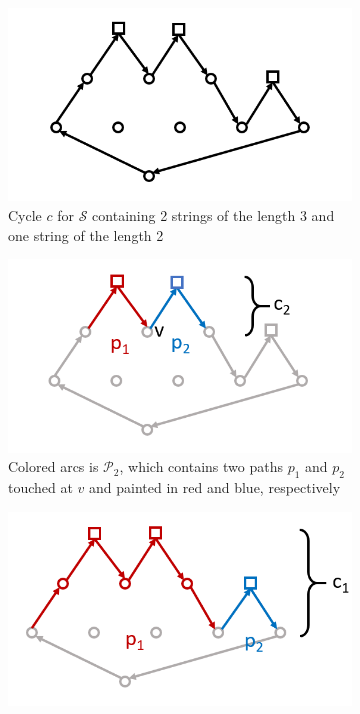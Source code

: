 \documentclass[11pt]{article}
\begin{document}
	\begin{figure}[h]
		\centering
		\begin{subfigure}[t]{0.3\textwidth}
			\includegraphics[width=\textwidth]{gha_is_greedy_img/fig1.png}
			\caption{Cycle $c$ for $\mathcal{S}$ containing 2 strings of the length 3 and one string of the length 2}
			\label{fig:1a}
		\end{subfigure}
		\hfil
		\begin{subfigure}[t]{0.3\textwidth}
			\includegraphics[width=\textwidth]{gha_is_greedy_img/fig2.png}
			\caption{Colored arcs is $\mathcal{P}_2$, which contains two paths $p_1$ and $p_2$ touched at $v$ and painted in red and blue, respectively}
			\label{fig:1b}
		\end{subfigure}
		\hfil
		\begin{subfigure}[t]{0.3\textwidth}
			\includegraphics[width=\textwidth]{gha_is_greedy_img/fig3.png}

\end{subfigure}
\end{figure}
\end{document}
